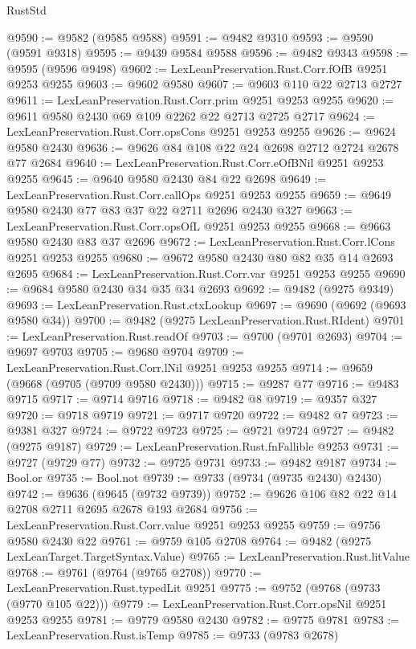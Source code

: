 \begin{lexlean}{RustStd}
\begin{coremodule}
{\begin{coremodule}
{{{{{{{{{{{{{{{{{{{{{{{{{{{{{{{{{{{{{{{{{{{{{{{{{{{{{{{@9590 := @9582 (@9585 @9588)
@9591 := @9482 @9310
@9593 := @9590 (@9591 @9318)
@9595 := @9439 @9584 @9588
@9596 := @9482 @9343
@9598 := @9595 (@9596 @9498)
@9602 := LexLeanPreservation.Rust.Corr.fOfB @9251 @9253 @9255
@9603 := @9602 @9580
@9607 := @9603 @110 @22 @2713 @2727
@9611 := LexLeanPreservation.Rust.Corr.prim @9251 @9253 @9255
@9620 := @9611 @9580 @2430 @69 @109 @2262 @22 @2713 @2725 @2717
@9624 := LexLeanPreservation.Rust.Corr.opsCons @9251 @9253 @9255
@9626 := @9624 @9580 @2430
@9636 := @9626 @84 @108 @22 @24 @2698 @2712 @2724 @2678 @77 @2684
@9640 := LexLeanPreservation.Rust.Corr.eOfBNil @9251 @9253 @9255
@9645 := @9640 @9580 @2430 @84 @22 @2698
@9649 := LexLeanPreservation.Rust.Corr.callOps @9251 @9253 @9255
@9659 := @9649 @9580 @2430 @77 @83 @37 @22 @2711 @2696 @2430 @327
@9663 := LexLeanPreservation.Rust.Corr.opsOfL @9251 @9253 @9255
@9668 := @9663 @9580 @2430 @83 @37 @2696
@9672 := LexLeanPreservation.Rust.Corr.lCons @9251 @9253 @9255
@9680 := @9672 @9580 @2430 @80 @82 @35 @14 @2693 @2695
@9684 := LexLeanPreservation.Rust.Corr.var @9251 @9253 @9255
@9690 := @9684 @9580 @2430 @34 @35 @34 @2693
@9692 := @9482 (@9275 @9349)
@9693 := LexLeanPreservation.Rust.ctxLookup
@9697 := @9690 (@9692 (@9693 @9580 @34))
@9700 := @9482 (@9275 LexLeanPreservation.Rust.RIdent)
@9701 := LexLeanPreservation.Rust.readOf
@9703 := @9700 (@9701 @2693)
@9704 := @9697 @9703
@9705 := @9680 @9704
@9709 := LexLeanPreservation.Rust.Corr.lNil @9251 @9253 @9255
@9714 := @9659 (@9668 (@9705 (@9709 @9580 @2430)))
@9715 := @9287 @77
@9716 := @9483 @9715
@9717 := @9714 @9716
@9718 := @9482 @8
@9719 := @9357 @327
@9720 := @9718 @9719
@9721 := @9717 @9720
@9722 := @9482 @7
@9723 := @9381 @327
@9724 := @9722 @9723
@9725 := @9721 @9724
@9727 := @9482 (@9275 @9187)
@9729 := LexLeanPreservation.Rust.fnFallible @9253
@9731 := @9727 (@9729 @77)
@9732 := @9725 @9731
@9733 := @9482 @9187
@9734 := Bool.or
@9735 := Bool.not
@9739 := @9733 (@9734 (@9735 @2430) @2430)
@9742 := @9636 (@9645 (@9732 @9739))
@9752 := @9626 @106 @82 @22 @14 @2708 @2711 @2695 @2678 @193 @2684
@9756 := LexLeanPreservation.Rust.Corr.value @9251 @9253 @9255
@9759 := @9756 @9580 @2430 @22
@9761 := @9759 @105 @2708
@9764 := @9482 (@9275 LexLeanTarget.TargetSyntax.Value)
@9765 := LexLeanPreservation.Rust.litValue
@9768 := @9761 (@9764 (@9765 @2708))
@9770 := LexLeanPreservation.Rust.typedLit @9251
@9775 := @9752 (@9768 (@9733 (@9770 @105 @22)))
@9779 := LexLeanPreservation.Rust.Corr.opsNil @9251 @9253 @9255
@9781 := @9779 @9580 @2430
@9782 := @9775 @9781
@9783 := LexLeanPreservation.Rust.isTemp
@9785 := @9733 (@9783 @2678)
}}}}}}}}}}}}}}}}}}}}}}}}}}}}}}}}}}}}}}}}}}}}}}}}}}}}}}}
\end{coremodule}}
\end{coremodule}
\end{lexlean}
